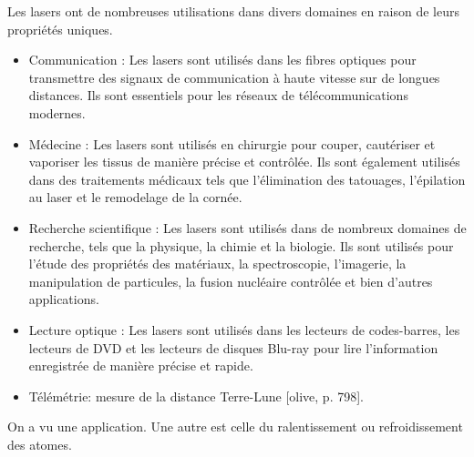 \documentclass[11pt]{report}
\numberwithin{figure}{section}
\numberwithin{equation}{section}
\numberwithin{table}{section}
\newcommand{\1}{\boldsymbol{1}}
\begin{document}
Les lasers ont de nombreuses utilisations dans divers domaines en raison de leurs propriétés uniques. 
\begin{itemize}
\item Communication : Les lasers sont utilisés dans les fibres optiques pour transmettre des signaux de communication à haute vitesse sur de longues distances. Ils sont essentiels pour les réseaux de télécommunications modernes.
\item Médecine : Les lasers sont utilisés en chirurgie pour couper, cautériser et vaporiser les tissus de manière précise et contrôlée. Ils sont également utilisés dans des traitements médicaux tels que l'élimination des tatouages, l'épilation au laser et le remodelage de la cornée.
\item Recherche scientifique : Les lasers sont utilisés dans de nombreux domaines de recherche, tels que la physique, la chimie et la biologie. Ils sont utilisés pour l'étude des propriétés des matériaux, la spectroscopie, l'imagerie, la manipulation de particules, la fusion nucléaire contrôlée et bien d'autres applications.
\item Lecture optique : Les lasers sont utilisés dans les lecteurs de codes-barres, les lecteurs de DVD et les lecteurs de disques Blu-ray pour lire l'information enregistrée de manière précise et rapide.
\item Télémétrie: mesure de la distance Terre-Lune [olive, p. 798].
\end{itemize}

On a vu une application. Une autre est celle du ralentissement ou refroidissement des atomes.
\end{document}
